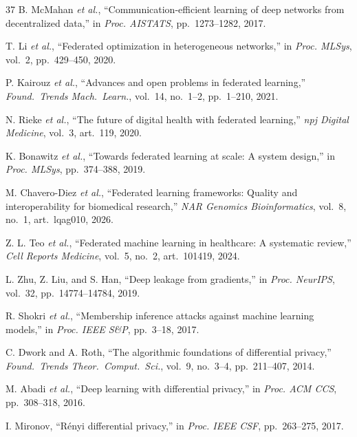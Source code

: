 \documentclass[conference]{IEEEtran}
\begin{document}
\begin{thebibliography}{37}
B. McMahan \textit{et al.}, ``Communication-efficient learning of deep networks from decentralized data,'' in \textit{Proc. AISTATS}, pp.~1273--1282, 2017.

T. Li \textit{et al.}, ``Federated optimization in heterogeneous networks,'' in \textit{Proc. MLSys}, vol.~2, pp.~429--450, 2020.

P. Kairouz \textit{et al.}, ``Advances and open problems in federated learning,'' \textit{Found.~Trends Mach.~Learn.}, vol.~14, no.~1--2, pp.~1--210, 2021.

N. Rieke \textit{et al.}, ``The future of digital health with federated learning,'' \textit{npj Digital Medicine}, vol.~3, art.~119, 2020.

K. Bonawitz \textit{et al.}, ``Towards federated learning at scale: A system design,'' in \textit{Proc. MLSys}, pp.~374--388, 2019.

M. Chavero-Diez \textit{et al.}, ``Federated learning frameworks: Quality and interoperability for biomedical research,'' \textit{NAR Genomics Bioinformatics}, vol.~8, no.~1, art.~lqag010, 2026.

Z. L. Teo \textit{et al.}, ``Federated machine learning in healthcare: A systematic review,'' \textit{Cell Reports Medicine}, vol.~5, no.~2, art.~101419, 2024.

L. Zhu, Z. Liu, and S. Han, ``Deep leakage from gradients,'' in \textit{Proc. NeurIPS}, vol.~32, pp.~14774--14784, 2019.

R. Shokri \textit{et al.}, ``Membership inference attacks against machine learning models,'' in \textit{Proc. IEEE S\&P}, pp.~3--18, 2017.

C. Dwork and A. Roth, ``The algorithmic foundations of differential privacy,'' \textit{Found.~Trends Theor.~Comput.~Sci.}, vol.~9, no.~3--4, pp.~211--407, 2014.

M. Abadi \textit{et al.}, ``Deep learning with differential privacy,'' in \textit{Proc. ACM CCS}, pp.~308--318, 2016.

I. Mironov, ``R\'enyi differential privacy,'' in \textit{Proc. IEEE CSF}, pp.~263--275, 2017.


\end{thebibliography}
\end{document}
